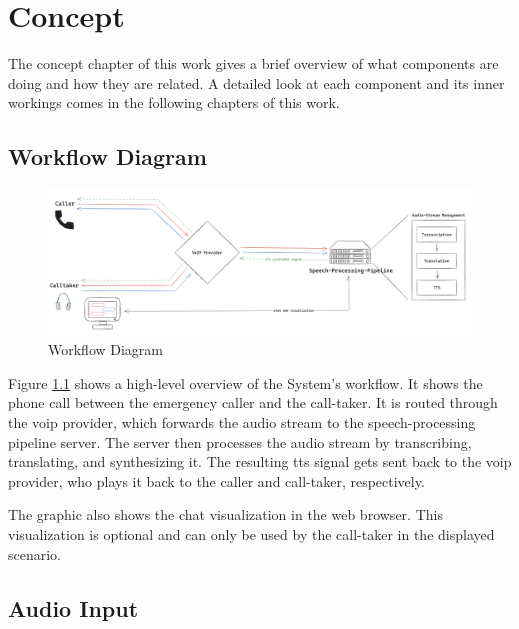 \chapter{Concept}

\label{Concept}

The concept chapter of this work gives a brief overview of what components are doing and how they are related. 
A detailed look at each component and its inner workings comes in the following chapters of this work.


\section{Workflow Diagram}

\begin{figure}[ht]
	\includegraphics[width=\textwidth]{Figures/data-flow-chart.png}
	\caption{Workflow Diagram}
	\label{fig:workflowDiagram}
\end{figure}

Figure \ref{fig:workflowDiagram} shows a high-level overview of the System's workflow. It shows the phone call between 
the emergency caller and the call-taker. It is routed through the \ac{voip} provider, which forwards the audio stream 
to the speech-processing pipeline server. The server then processes the audio stream by transcribing, translating, and 
synthesizing it. The resulting tts signal gets sent back to the \ac{voip} provider, who plays it back to the caller and 
call-taker, respectively.

The graphic also shows the chat visualization in the web browser. This visualization is optional and can only be used 
by the call-taker in the displayed scenario.


\section{Audio Input}


